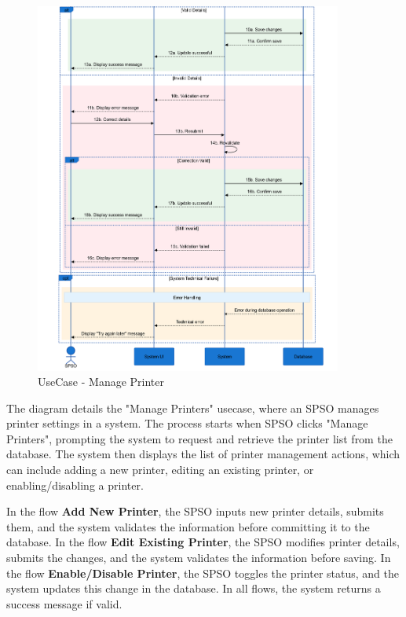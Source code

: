 \begin{figure}[H]
    \centering
    \includegraphics[width=0.9\textwidth ]{images/sequence_diagram/Manage Printers_2.png}
    \caption{UseCase - Manage Printer}
    \label{fig:manage_printer}
\end{figure}

The diagram details the "Manage Printers" usecase, where an SPSO manages printer settings in a system. The process starts when SPSO clicks "Manage Printers", prompting the system to request and retrieve the printer list from the database. The system then displays the list of printer management actions, which can include adding a new printer, editing an existing printer, or enabling/disabling a printer.

In the flow \textbf{Add New Printer}, the SPSO inputs new printer details, submits them, and the system validates the information before committing it to the database. 
In the flow \textbf{Edit Existing Printer}, the SPSO modifies printer details, submits the changes, and the system validates the information before saving. 
In the flow \textbf{Enable/Disable Printer}, the SPSO toggles the printer status, and the system updates this change in the database. In all flows, the system returns a success message if valid.

